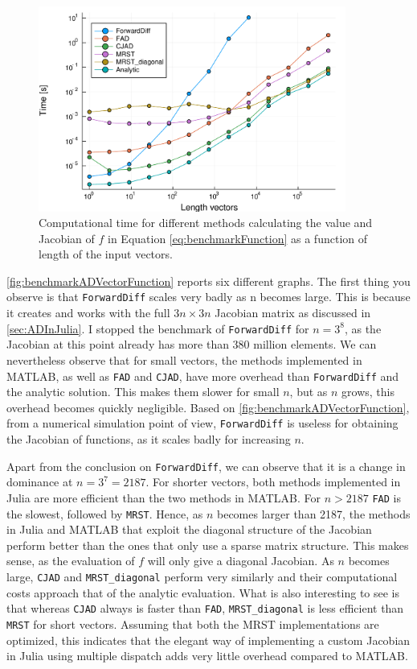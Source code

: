 \begin{figure}[H]
    \centering
    \includegraphics[width = 0.9\textwidth]{figures/benchmark_all_ADs.pdf}
    \caption{Computational time for different methods calculating the value and Jacobian of $f$ in Equation \eqref{eq:benchmarkFunction} as a function of length of the input vectors.}
    \label{fig:benchmarkADVectorFunction}
\end{figure}
\autoref{fig:benchmarkADVectorFunction} reports six different graphs. The first thing you observe is that \texttt{ForwardDiff} scales very badly as n becomes large. This is because it creates and works with the full $3n \times 3n$ Jacobian matrix as discussed in \autoref{sec:ADInJulia}. I stopped the benchmark of \texttt{ForwardDiff} for $n = 3^8$, as the Jacobian at this point already has more than 380 million elements. We can nevertheless observe that for small vectors, the methods implemented in MATLAB, as well as \texttt{FAD} and \texttt{CJAD}, have more overhead than \texttt{ForwardDiff} and the analytic solution. This makes them slower for small $n$, but as $n$ grows, this overhead becomes quickly negligible. Based on \autoref{fig:benchmarkADVectorFunction}, from a numerical simulation point of view, \texttt{ForwardDiff} is useless for obtaining the Jacobian of functions, as it scales badly for increasing $n$.

Apart from the conclusion on \texttt{ForwardDiff}, we can observe that it is a change in dominance at $n = 3^7 = 2187$. For shorter vectors, both methods implemented in Julia are more efficient than the two methods in MATLAB. For $n>2187$ \texttt{FAD} is the slowest, followed by \texttt{MRST}. Hence, as $n$ becomes larger than 2187, the methods in Julia and MATLAB that exploit the diagonal structure of the Jacobian perform better than the ones that only use a sparse matrix structure. This makes sense, as the evaluation of $f$ will only give a diagonal Jacobian. As $n$ becomes large, \texttt{CJAD} and \texttt{MRST\_diagonal} perform very similarly and their computational costs approach that of the analytic evaluation. What is also interesting to see is that whereas \texttt{CJAD} always is faster than \texttt{FAD}, \texttt{MRST\_diagonal} is less efficient than \texttt{MRST} for short vectors. Assuming that both the MRST implementations are optimized, this indicates that the elegant way of implementing a custom Jacobian in Julia using multiple dispatch adds very little overhead compared to MATLAB. 


